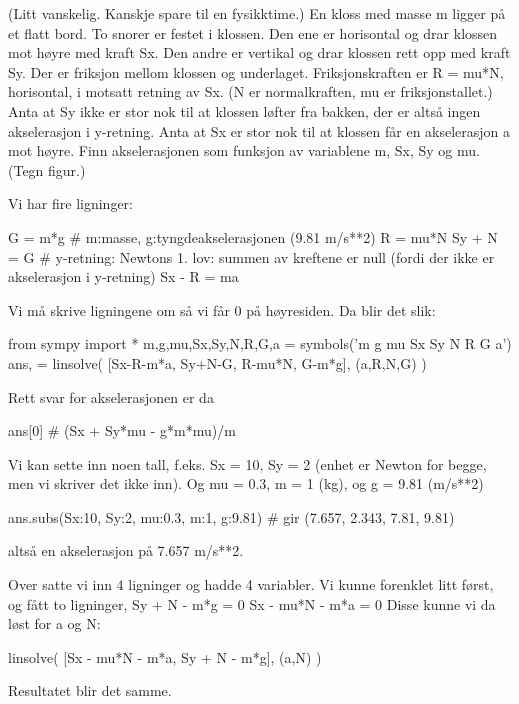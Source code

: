 (Litt vanskelig. Kanskje spare til en fysikktime.) En kloss med masse m ligger på et flatt bord. To snorer er festet i klossen. Den ene er horisontal og drar klossen mot høyre med kraft Sx. Den andre er vertikal og drar klossen rett opp med kraft Sy. Der er friksjon mellom klossen og underlaget. Friksjonskraften er R = mu*N, horisontal, i motsatt retning av Sx. (N er normalkraften, mu er friksjonstallet.) Anta at Sy ikke er stor nok til at klossen løfter fra bakken, der er altså ingen akselerasjon i y-retning. Anta at Sx er stor nok til at klossen får en akselerasjon a mot høyre. Finn akselerasjonen som funksjon av variablene m, Sx, Sy og mu. 
(Tegn figur.)

Vi har fire ligninger:
\begin{usncodebox}
G = m*g       # m:masse, g:tyngdeakselerasjonen (9.81 m/s**2)
R = mu*N      
Sy + N = G    # y-retning: Newtons 1. lov: summen av kreftene er null (fordi der ikke er akselerasjon i y-retning)
Sx - R = ma
\end{usncodebox}

Vi må skrive ligningene om så vi får 0 på høyresiden. 
Da blir det slik:
\begin{usncodebox}
from sympy import *
m,g,mu,Sx,Sy,N,R,G,a = symbols('m g mu Sx Sy N R G a')
ans, = linsolve( [Sx-R-m*a, Sy+N-G, R-mu*N, G-m*g], (a,R,N,G) )
\end{usncodebox}

Rett svar for akselerasjonen er da
\begin{usncodebox}
ans[0]        # (Sx + Sy*mu - g*m*mu)/m
\end{usncodebox}

Vi kan sette inn noen tall, f.eks. Sx = 10, Sy = 2 (enhet er Newton for begge, men vi skriver det ikke inn). Og mu = 0.3, m = 1 (kg), og g = 9.81 (m/s**2)
\begin{usncodebox}
ans.subs({Sx:10, Sy:2, mu:0.3, m:1, g:9.81})   # gir (7.657, 2.343, 7.81, 9.81)
\end{usncodebox}

altså en akselerasjon på 7.657 m/s**2.

Over satte vi inn 4 ligninger og hadde 4 variabler. Vi kunne forenklet litt først, og fått to ligninger,
Sy + N - m*g = 0
Sx - mu*N - m*a = 0
Disse kunne vi da løst for a og N:
\begin{usncodebox}
linsolve( [Sx - mu*N - m*a, Sy + N - m*g], (a,N) )
\end{usncodebox}
Resultatet blir det samme. 

